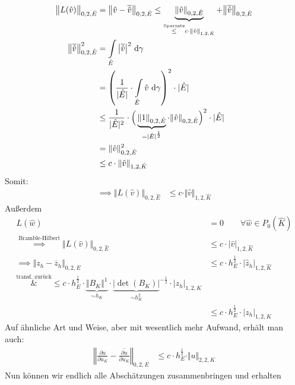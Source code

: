 \begin{align*}
\big\Vert L(\hat{v})\big\Vert_{0,2,\hat{E}}
&=\big\Vert\hat{v}-\overline{\hat{v}}\big\Vert_{0,2,\hat{E}}
\leq
\underbrace{\Vert\hat{v}\Vert_{0,2,\hat{E}}}_{\stackrel{\text{Spursatz}}{\leq} c\cdot\Vert\hat{v}\Vert_{1,2,\hat{K}}}+\big\Vert\overline{\hat{v}}\big\Vert_{0,2,\hat{E}}\\
\big\Vert\overline{\hat{v}}\big\Vert^2_{0,2,\hat{E}}
&=
\int\limits_{\hat{E}}\big|\overline{\hat{v}}\big|^2\text{ d}\gamma \\
&=
\left(\frac{1}{|\hat{E}|}\cdot\int\limits_{\hat{E}}\hat{v}\text{ d}\gamma\right)^2\cdot|\hat{E}|\\
&\leq
\frac{1}{|\hat{E}|^2}\cdot\Big(\underbrace{\Vert1\Vert_{0,2,\hat{E}}}_{=|\hat{E}|^{\frac{1}{2}}}\cdot\Vert\hat{v}\Vert_{0,2,\hat{E}}\Big)^2\cdot|\hat{E}|\\
&=\Vert\hat{v}\Vert^2_{0,2,\hat{E}}\\
&\leq c\cdot\Vert\hat{v}\Vert_{1,2,\hat{K}}
\end{align*}
Somit:
\begin{align*}
\implies
\big\Vert L(\hat{v})\big\Vert_{0,2,\hat{E}}
&\leq c\cdot\Vert\hat{v}\Vert_{1,2,\hat{K}}
\end{align*}
Außerdem
\begin{align*}
L(\hat{w})&=0\qquad\forall\hat{w}\in P_0(\hat{K})\\
\overset{\text{Bramble-Hilbert}}{\implies}
\big\Vert L(\hat{v})\big\Vert_{0,2,\hat{E}}
&\leq
c\cdot|\hat{v}|_{1,2,\hat{K}}\\
\implies
\big\Vert z_h-\overline{z}_h\big\Vert_{0,2,E}
&\leq c\cdot h_E^{\frac{1}{2}}\cdot\big|\hat{z}_h\big|_{1,2,\hat{K}}\\
\overset{\text{transf. zurück}}&{\leq}
c\cdot h_E^{\frac{1}{2}}\cdot\underbrace{\Vert B_K\Vert^1}_{\sim h_K}\cdot{\underbrace{\big|\det(B_K)\big|}_{\sim h_K^2}}^{-\frac{1}{2}}\cdot|z_h|_{1,2,K}\\
&\leq
c\cdot h_E^{\frac{1}{2}}\cdot|z_h|_{1,2,K}
\end{align*}
Auf ähnliche Art und Weise, aber mit wesentlich mehr Aufwand, erhält man auch:
\begin{align*}
\left\Vert\frac{\partial u}{\partial u_K}-\overline{\frac{\partial u}{\partial u_K}}\right\Vert_{0,2,E}
&\leq c\cdot h_E^{\frac{1}{2}}\cdot\Vert u\Vert_{2,2,K}
\end{align*}
Nun können wir endlich alle Abschätzungen zusammenbringen und erhalten
